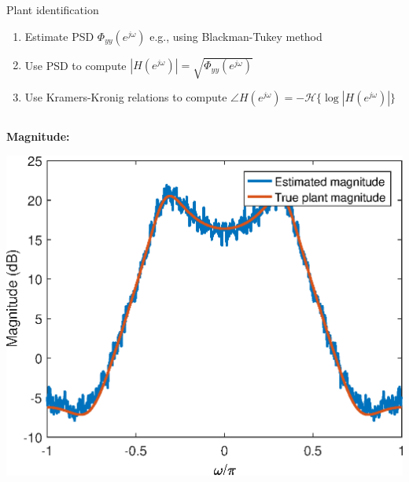 \documentclass[10pt]{beamer}
\begin{document}
\begin{frame}{Plant identification}
\begin{enumerate}
	\item Estimate PSD $\Phi_{yy}(e^{j\omega})$ e.g., using Blackman-Tukey method
	\item Use PSD to compute $|H(e^{j\omega})| = \sqrt{\Phi_{yy}(e^{j\omega})}$
	\item Use Kramers-Kronig relations to compute $\angle H(e^{j\omega}) = -\mathcal{H}\{\log|H(e^{j\omega})|\}$
\end{enumerate}

\begin{columns}
	\begin{column}{0.5\textwidth}
		\textbf{Magnitude:}	
		\begin{center}
			\includegraphics[width=\textwidth]{../homework/figs/inverse_control_kramers_kronig_id_mag.eps}
		\end{center}
	\end{column}


\end{columns}
\end{frame}
\end{document}
